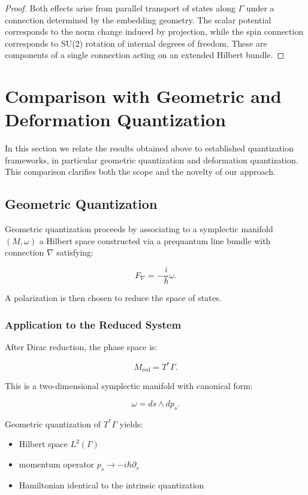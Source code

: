 \documentclass[11pt]{article}
\begin{document}
\begin{proof}
Both effects arise from parallel transport of states along $\Gamma$ under a connection determined by the embedding geometry. The scalar potential corresponds to the norm change induced by projection, while the spin connection corresponds to SU(2) rotation of internal degrees of freedom. These are components of a single connection acting on an extended Hilbert bundle.
\end{proof}



\section{Comparison with Geometric and Deformation Quantization}

In this section we relate the results obtained above to established quantization frameworks, in particular geometric quantization and deformation quantization. This comparison clarifies both the scope and the novelty of our approach.

\subsection{Geometric Quantization}

Geometric quantization proceeds by associating to a symplectic manifold $(M,\omega)$ a Hilbert space constructed via a prequantum line bundle with connection $\nabla$ satisfying:

\begin{equation}
F_\nabla = -\frac{i}{\hbar}\omega.
\end{equation}

A polarization is then chosen to reduce the space of states.

\subsubsection{Application to the Reduced System}

After Dirac reduction, the phase space is:

\[
M_{\mathrm{red}} = T^*\Gamma.
\]

This is a two-dimensional symplectic manifold with canonical form:

\[
\omega = ds \wedge dp_s.
\]

Geometric quantization of $T^*\Gamma$ yields:

\begin{itemize}
\item Hilbert space $L^2(\Gamma)$
\item momentum operator $p_s \to -i\hbar \partial_s$
\item Hamiltonian identical to the intrinsic quantization
\end{itemize}
\end{document}
